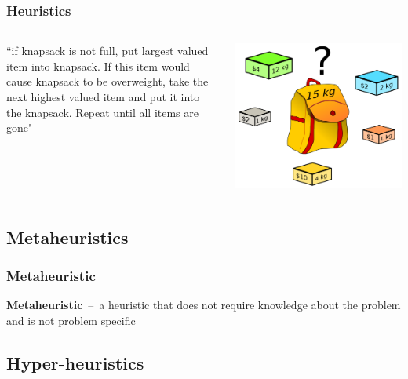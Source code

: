 \documentclass{beamer}
\newcommand{\linespace}{\vskip 0.25cm}
\begin{document}
\begin{frame}
	\frametitle{Heuristics}
	\begin{columns}
		\begin{column}{.6\textwidth}
			``if knapsack is not full, put largest valued item into knapsack. If this item would cause knapsack to be overweight, take the next highest valued item and put it into the knapsack. Repeat until all items are gone"
		\end{column}
		\begin{column}{.4\textwidth}
			\includegraphics[height=.45\textheight]{Illustrations/knapsack.PNG}
			\\
		\end{column}
	\end{columns}
\end{frame}

\subsection{Metaheuristics}

\begin{frame}
	\frametitle{Metaheuristic}
	\textbf{Metaheuristic}~--~a heuristic that does not require knowledge about the problem and is not problem specific
	\linespace
\end{frame}

\subsection{Hyper-heuristics}
\end{document}
